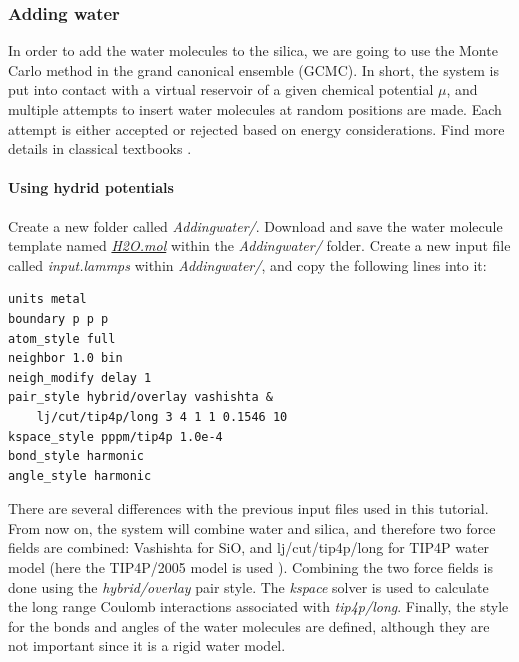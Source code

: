 \documentclass[9pt,tutorial]{livecoms}
\begin{document}
\subsubsection{Adding water}
\noindent In order to add the water molecules to the silica, we are going to use the Monte Carlo method in the grand canonical
ensemble (GCMC). In short, the system is put into contact with a virtual reservoir of a given chemical potential
$\mu$, and multiple attempts to insert water molecules at random positions are made. Each attempt is either accepted or rejected based on energy considerations. Find more details in classical textbooks \cite{frenkel2023understanding}.

\paragraph{Using hydrid potentials}
\noindent Create a new folder called \textit{Addingwater/}. Download and save the water molecule template named \href{https://raw.githubusercontent.com/lammpstutorials/lammpstutorials-article/main/files/tutorial6/H2O.mol}{\textit{H2O.mol}} within the \textit{Addingwater/} folder. Create a new input file called \textit{input.lammps} within \textit{Addingwater/}, and copy the following lines into it:
{\normalsize \begin{verbatim}
units metal
boundary p p p
atom_style full
neighbor 1.0 bin
neigh_modify delay 1
pair_style hybrid/overlay vashishta &
    lj/cut/tip4p/long 3 4 1 1 0.1546 10
kspace_style pppm/tip4p 1.0e-4
bond_style harmonic
angle_style harmonic
\end{verbatim}}
There are several differences with the previous input files used in this tutorial. From now on, the system will combine water and silica, and therefore two force fields are combined: Vashishta for SiO, and lj/cut/tip4p/long for TIP4P water model (here 
the TIP4P/2005 model is used \cite{abascal2005general}). Combining the two force fields is done using the \textit{hybrid/overlay} pair style. The \textit{kspace} solver is used to calculate the long range Coulomb interactions associated with \textit{tip4p/long}. Finally, the style for the bonds and angles of the water molecules are defined, although they are not important since it is a rigid water model.
\end{document}
